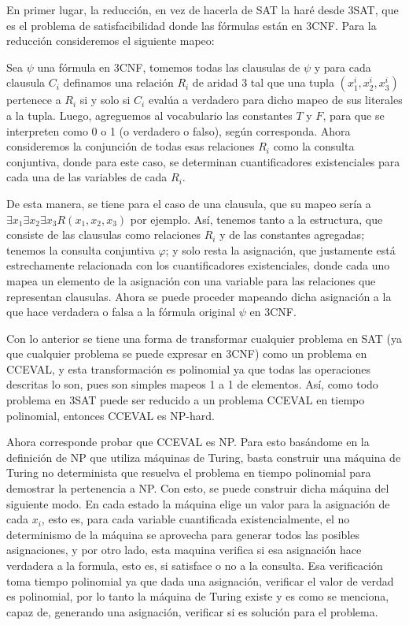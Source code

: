 \documentclass[letterpaper,10pt]{article}
\begin{document}
\begin{itemize}
    En primer lugar, la reducción, en vez de hacerla de SAT la haré desde 3SAT, que es el problema de satisfacibilidad donde las fórmulas están en 3CNF. Para la reducción consideremos el siguiente mapeo:

    Sea $\psi$ una fórmula en 3CNF, tomemos todas las clausulas de $\psi$ y para cada clausula $C_i$ definamos una relación $R_i$ de aridad 3 tal que una tupla $(x_1^i, x_2^i, x_3^i)$ pertenece a $R_i$ si y solo si $C_i$ evalúa a verdadero para dicho mapeo de sus literales a la tupla. Luego, agreguemos al vocabulario las constantes $T$ y $F$, para que se interpreten como 0 o 1 (o verdadero o falso), según corresponda. Ahora consideremos la conjunción de todas esas relaciones $R_i$ como la consulta conjuntiva, donde para este caso, se determinan cuantificadores existenciales para cada una de las variables de cada $R_i$.

    De esta manera, se tiene para el caso de una clausula, que su mapeo sería a $\exists x_1 \exists x_2 \exists x_3 R(x_1, x_2, x_3)$ por ejemplo. Así, tenemos tanto a la estructura, que consiste de las clausulas como relaciones $R_i$ y de las constantes agregadas; tenemos la consulta conjuntiva $\varphi$; y solo resta la asignación, que justamente está estrechamente relacionada con los cuantificadores existenciales, donde cada uno mapea un elemento de la asignación con una variable para las relaciones que representan clausulas. Ahora se puede proceder mapeando dicha asignación a la que hace verdadera o falsa a la fórmula original $\psi$ en 3CNF.

    Con lo anterior se tiene una forma de transformar cualquier problema en SAT (ya que cualquier problema se puede expresar en 3CNF) como un problema en CCEVAL, y esta transformación es polinomial ya que todas las operaciones descritas lo son, pues son simples mapeos 1 a 1 de elementos. Así, como todo problema en 3SAT puede ser reducido a un problema CCEVAL en tiempo polinomial, entonces CCEVAL es NP-hard.

    Ahora corresponde probar que CCEVAL es NP. Para esto basándome en la definición de NP que utiliza máquinas de Turing, basta construir una máquina de Turing no determinista que resuelva el problema en tiempo polinomial para demostrar la pertenencia a NP. Con esto, se puede construir dicha máquina del siguiente modo. En cada estado la máquina elige un valor para la asignación de cada $x_i$, esto es, para cada variable cuantificada existencialmente, el no determinismo de la máquina se aprovecha para generar todos las posibles asignaciones, y por otro lado, esta maquina verifica si esa asignación hace verdadera a la formula, esto es, si satisface o no a la consulta. Esa verificación toma tiempo polinomial ya que dada una asignación, verificar el valor de verdad es polinomial, por lo tanto la máquina de Turing existe y es como se menciona, capaz de, generando una asignación, verificar si es solución para el problema.


\end{itemize}
\end{document}
